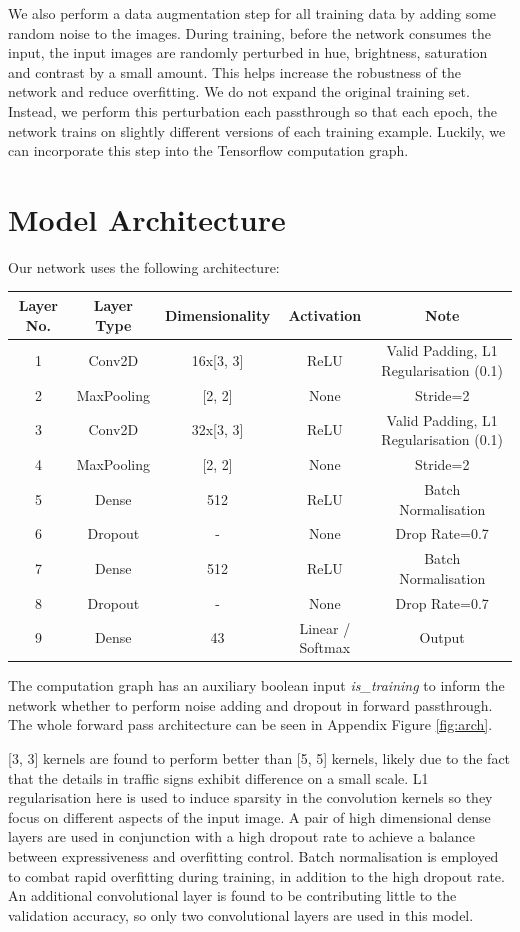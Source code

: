 \documentclass[]{article}
\begin{document}
We also perform a data augmentation step for all training data by adding some random noise to the images. During training, before the network consumes the input, the input images are randomly perturbed in hue, brightness, saturation and contrast by a small amount. This helps increase the robustness of the network and reduce overfitting. We do not expand the original training set. Instead, we perform this perturbation each passthrough so that each epoch, the network trains on slightly different versions of each training example. Luckily, we can incorporate this step into the Tensorflow computation graph.

\newpage
\section{Model Architecture}

Our network uses the following architecture:

\begin{center}
	\begin{tabular}{c | c | c | c | c}
		\hline
		Layer No. & Layer Type & Dimensionality & Activation & Note \\ \hline
		1 & Conv2D & 16x[3, 3] & ReLU & Valid Padding, L1 Regularisation (0.1) \\ \hline
		2 & MaxPooling & [2, 2] & None & Stride=2 \\ \hline
		3 & Conv2D & 32x[3, 3] & ReLU & Valid Padding, L1 Regularisation (0.1) \\ \hline
		4 & MaxPooling & [2, 2] & None & Stride=2 \\ \hline
		5 & Dense & 512 & ReLU & Batch Normalisation \\ \hline
		6 & Dropout & - & None & Drop Rate=0.7 \\ \hline
		7 & Dense & 512 & ReLU & Batch Normalisation \\ \hline
		8 & Dropout & - & None & Drop Rate=0.7 \\ \hline
		9 & Dense & 43 & Linear / Softmax & Output \\ \hline
	\end{tabular}
\end{center}

The computation graph has an auxiliary boolean input \textit{is\_training} to inform the network whether to perform noise adding and dropout in forward passthrough. The whole forward pass architecture can be seen in Appendix Figure \ref{fig:arch}.

[3, 3] kernels are found to perform better than [5, 5] kernels, likely due to the fact that the details in traffic signs exhibit difference on a small scale. L1 regularisation here is used to induce sparsity in the convolution kernels so they focus on different aspects of the input image. A pair of high dimensional dense layers are used in conjunction with a high dropout rate to achieve a balance between expressiveness and overfitting control. Batch normalisation is employed to combat rapid overfitting during training, in addition to the high dropout rate. An additional convolutional layer is found to be contributing little to the validation accuracy, so only two convolutional layers are used in this model.
\end{document}
